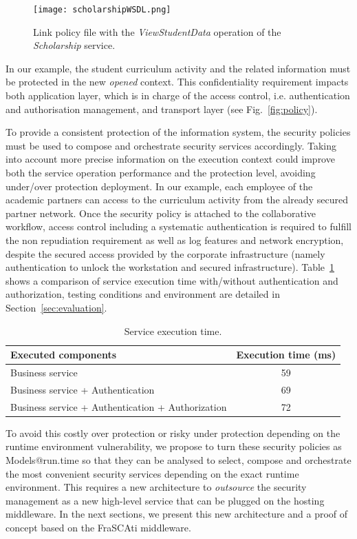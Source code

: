 \documentclass[runningheads,a4paper]{llncs}
\begin{document}
\begin{figure}[ht!]  
\centering
\texttt{[image: scholarshipWSDL.png]}
\caption{Link policy file with the \emph{ViewStudentData} operation of the \emph{Scholarship} service.}
\label{fig:wsdl}
\end{figure}

In our example, the student curriculum activity and the related information must be protected in the new \textit{opened} context. This confidentiality requirement impacts both application layer, which is in charge of the access control, i.e. authentication and authorisation management, and transport layer (see Fig.~\ref{fig:policy}). 

To provide a consistent protection of the information system, the security policies must be used to compose and orchestrate security services accordingly. Taking into account more precise information on the execution context could improve both the service operation performance and the protection level, avoiding under/over protection deployment. In our example, each employee of the academic partners can access to the curriculum activity from the already secured partner network. Once the security policy is attached to the collaborative workflow, access control including a systematic authentication is required to fulfill the non repudiation requirement as well as log features and network encryption, despite the secured access provided by the corporate infrastructure (namely authentication to unlock the workstation and secured infrastructure). Table~\ref{tab:tab1} shows a comparison of service execution time with/without authentication and authorization, testing conditions and environment are detailed in Section~\ref{sec:evaluation}.

\begin{table}
\caption{Service execution time.}
\begin{tabular}{|p{8cm}|c|}
\hline
Executed components & Execution time (ms)\\
  \hline
 Business service & 59\\
 Business service + Authentication & 69\\ 
 Business service + Authentication + Authorization & 72\\ 
    \hline
\end{tabular}
\label{tab:tab1}
\end{table}

To avoid this costly over protection or risky under protection depending on the runtime environment vulnerability, we propose to turn these security policies as Models@run.time so that they can be analysed to select, compose and orchestrate the most convenient security services depending on the exact runtime environment. This requires a new architecture to \textit{outsource} the security management as a new high-level service that can be plugged on the hosting middleware. In the next sections, we present this new architecture and a proof of concept based on the FraSCAti middleware.
\end{document}
